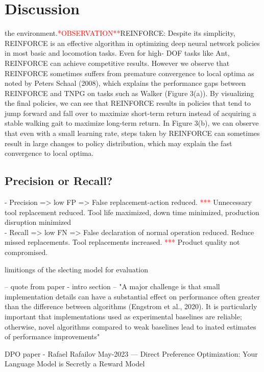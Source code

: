 \documentclass[a4paper, 12pt]{article}
\begin{document}
\section{Discussion}\label{sec:Discussion}
\cite{duan2016benchmarking} the environment.\textcolor{red}{*OBSERVATION**}REINFORCE: Despite its simplicity, REINFORCE is an
effective algorithm in optimizing deep neural network policies
in most basic and locomotion tasks. Even for high-
DOF tasks like Ant, REINFORCE can achieve competitive
results. However we observe that REINFORCE sometimes
suffers from premature convergence to local optima
as noted by Peters  Schaal (2008), which explains the performance
gaps between REINFORCE and TNPG on tasks
such as Walker (Figure 3(a)). By visualizing the final policies,
we can see that REINFORCE results in policies that
tend to jump forward and fall over to maximize short-term
return instead of acquiring a stable walking gait to maximize
long-term return. In Figure 3(b), we can observe
that even with a small learning rate, steps taken by REINFORCE
can sometimes result in large changes to policy
distribution, which may explain the fast convergence to local
optima.


\subsection{Precision or Recall?}
- Precision => low FP => False replacement-action reduced. \textcolor{red}{***} Unnecessary tool replacement reduced. Tool life maximized, down time minimized, production disruption minimized \\
- Recall => low FN => False declaration of normal operation reduced. Reduce missed replacements. Tool replacements increased. \textcolor{red}{***} Product quality not compromised. 


limitiongs of the slecting model for evaluation

\cite{SB3-paper} -- quote from paper - intro section -- "A major challenge is that small implementation details can have a substantial effect on performance often greater than the difference between algorithms (Engstrom et al., 2020). It is particularly important that  implementations used as experimental baselines are reliable; otherwise, novel algorithms compared to weak baselines lead to inated estimates of performance improvements"

DPO paper - Rafael Rafailov May-2023 --- Direct Preference Optimization: Your Language Model is Secretly a Reward Model 
\end{document}
